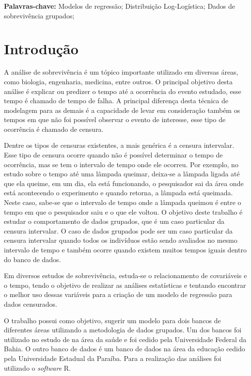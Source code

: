 \documentclass[a4paper,12pt]{article}
\newcommand*\NewPage{\newpage\null\newpage}
\begin{document}
\textbf{Palavras-chave:} Modelos de regressão; Distribuição Log-Logística; Dados de sobrevivência grupados;

\NewPage

\newpage
\pagestyle{plain}
\section{Introdução}
\noindent

A análise de sobrevivência é um tópico importante utilizado em diversas áreas, como biologia, engenharia, medicina, entre outros. O principal objetivo desta análise é explicar ou predizer o tempo até a ocorrência do evento estudado, esse tempo é chamado de tempo de falha. A principal diferença desta técnica de modelagem para as demais é a capacidade de levar em consideração também os tempos em que não foi possível observar o evento de interesse, esse tipo de ocorrência é chamado de censura.

Dentre os tipos de censuras existentes, a mais genérica é a censura intervalar. Esse tipo de censura ocorre quando não é possível determinar o tempo de ocorrência, mas se tem o intervalo de tempo onde ele ocorreu. Por exemplo, no estudo sobre o tempo até uma lâmpada queimar, deixa-se a lâmpada ligada até que ela queime, em um dia, ela está funcionando, o pesquisador sai da área onde está acontecendo o experimento e quando retorna, a lâmpada está queimada. Neste caso, sabe-se que o intervalo de tempo onde a lâmpada queimou é entre o tempo em que o pesquisador saiu e o que ele voltou. O objetivo deste trabalho é estudar o comportamento de dados grupados, que é um caso particular da censura intervalar. O caso de dados grupados pode ser um caso particular da censura intervalar quando todos os indivíduos estão sendo avaliados no mesmo intervalo de tempo e também ocorre quando existem muitos tempos iguais dentro do banco de dados.

Em diversos estudos de sobrevivência, estuda-se o relacionamento de covariáveis e o tempo, tendo o objetivo de realizar as análises estatísticas e tentando encontrar o melhor uso dessas variáveis para a criação de um modelo de regressão para dados censurados.

O trabalho possui como objetivo, sugerir um modelo para dois bancos de diferentes áreas utilizando a metodologia de dados grupados. Um dos bancos foi utilizado no estudo de \cite{Barreto} na área da saúde e foi cedido pela Universidade Federal da Bahia. O outro banco de dados é um banco de dados na área da educação cedido pela Universidade Estadual da Paraíba. Para a realização das análises foi utilizado o \textit{software} R.
\NewPage
\end{document}
